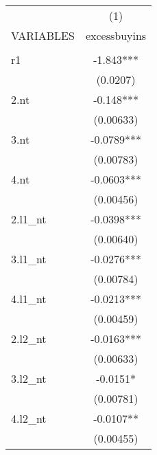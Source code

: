 \documentclass{beamer}
\begin{document}
\begin{frame}

    \begin{tabular}{lc} \hline
                      & (1)                                       \\
        VARIABLES     & excessbuyins                              \\ \hline
                      &                                           \\
        r1            & -1.843***                                 \\
                      & (0.0207)                                  \\
        2.nt          & -0.148***                                 \\
                      & (0.00633)                                 \\
        3.nt          & -0.0789***                                \\
                      & (0.00783)                                 \\
        4.nt          & -0.0603***                                \\
                      & (0.00456)                                 \\
        2.l1\_nt      & -0.0398***                                \\
                      & (0.00640)                                 \\
        3.l1\_nt      & -0.0276***                                \\
                      & (0.00784)                                 \\
        4.l1\_nt      & -0.0213***                                \\
                      & (0.00459)                                 \\
        2.l2\_nt      & -0.0163***                                \\
                      & (0.00633)                                 \\
        3.l2\_nt      & -0.0151*                                  \\
                      & (0.00781)                                 \\
        4.l2\_nt      & -0.0107**                                 \\
                      & (0.00455)                                 \\

\end{tabular}
\end{frame}
\end{document}
